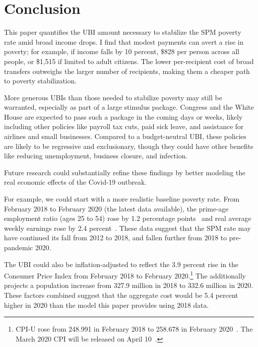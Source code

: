 \documentclass[12pt]{article}
\begin{document}
\section{Conclusion} \label{sec:conclusion}

This paper quantifies the UBI amount necessary to stabilize the SPM poverty rate amid broad income drops. I find that modest payments can avert a rise in poverty; for example, if income falls by 10 percent, \$828 per person across all people, or \$1,515 if limited to adult citizens. The lower per-recipient cost of broad transfers outweighs the larger number of recipients, making them a cheaper path to poverty stabilization.

More generous UBIs than those needed to stabilize poverty may still be warranted, especially as part of a large stimulus package. Congress and the White House are expected to pass such a package in the coming days or weeks, likely including other policies like payroll tax cuts, paid sick leave, and assistance for airlines and small businesses. Compared to a budget-neutral UBI, these policies are likely to be regressive and exclusionary, though they could have other benefits like reducing unemployment, business closure, and infection.

Future research could substantially refine these findings by better modeling the real economic effects of the Covid-19 outbreak.

For example, we could start with a more realistic baseline poverty rate. From February 2018 to February 2020 (the latest data available), the prime-age employment ratio (ages 25 to 54) rose by 1.2 percentage points~\cite{fred_paepop} and real average weekly earnings rose by 2.4 percent~\cite{bls_earnings}. These data suggest that the SPM rate may have continued its fall from 2012 to 2018, and fallen further from 2018 to pre-pandemic 2020.

The UBI could also be inflation-adjusted to reflect the 3.9 percent rise in the Consumer Price Index from February 2018 to February 2020.\footnote{CPI-U rose from 248.991 in February 2018 to 258.678 in February 2020~\cite{bls_cpi_data}. The March 2020 CPI will be released on April 10~\cite{bls_cpi_releases}.} The  additionally projects a population increase from 327.9 million in 2018 to 332.6 million in 2020. These factors combined suggest that the aggregate cost would be 5.4 percent higher in 2020 than the model this paper provides using 2018 data.
\end{document}
